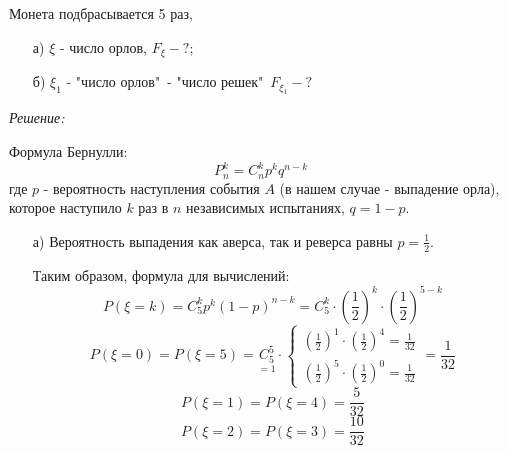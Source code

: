 \begin{exmp}
	Монета подбрасывается 5 раз,
	\begin{enumerate}
		\item[а)] $\xi$ - число орлов, $F_{\xi} - ?$;
		\item[б)] $\xi_1$ - "число орлов"\, - "число решек"\, $F_{\xi_1} - ?$
	\end{enumerate}
	
	\noindent \textit{Решение:}
	
	Формула Бернулли:
	\[ P_n^k = C_n^k p^k q^{n-k} \]
	\noindent где $p$ - вероятность наступления события $A$ (в нашем случае - выпадение орла), которое наступило $k$ раз в $n$ независимых испытаниях, $q=1-p$.
	
	\begin{enumerate}
		\item[а)] Вероятность выпадения как аверса, так и реверса равны $p = \frac{1}{2}$. 
		
		Таким образом, формула для вычислений:
		\[ P(\xi = k) = C_5^k p^k (1 - p)^{n-k} = C_5^k \cdot \left(\frac{1}{2}\right)^k \cdot \left(\frac{1}{2}\right)^{5-k} \]
		\[ P(\xi = 0) = P(\xi = 5) = \underset{=1}{C_5^5} \cdot 
		\begin{cases}
		\left(\frac{1}{2}\right)^1 \cdot \left(\frac{1}{2}\right)^4 = \frac{1}{32} \\
		\left(\frac{1}{2}\right)^5 \cdot \left(\frac{1}{2}\right)^0 = \frac{1}{32}
		\end{cases}
		= \frac{1}{32}
		\]
		\[ P(\xi = 1) = P(\xi = 4) = \frac{5}{32} \]
		\[ P(\xi = 2) = P(\xi = 3) = \frac{10}{32} \]
		

\end{enumerate}
\end{exmp}
